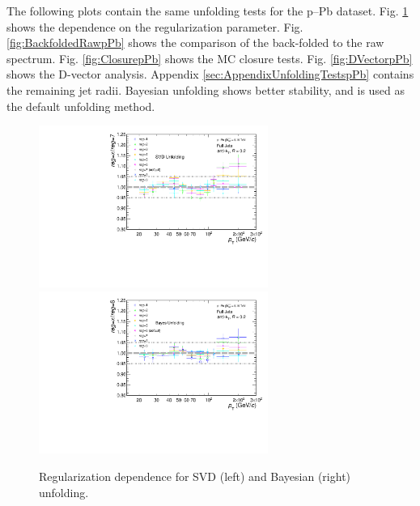 \documentclass[ALICE]{ALICE_analysis_notes}
\newcommand{\pPb}{{\mbox{p--Pb}}\xspace}
\begin{document}
The following plots contain the same unfolding tests for the \pPb dataset. Fig. \ref{fig:RegIterpPb} shows the dependence on the regularization parameter. Fig. \ref{fig:BackfoldedRawpPb} shows the comparison of the back-folded to the raw spectrum. Fig. \ref{fig:ClosurepPb} shows the MC closure tests. Fig. \ref{fig:DVectorpPb} shows the D-vector analysis. Appendix \ref{sec:AppendixUnfoldingTestspPb} contains the remaining jet radii. Bayesian unfolding shows better stability, and is used as the default unfolding method.

\begin{figure}
    \centering
    \begin{multicols}{2}
            \includegraphics[width=7.5cm]{figures/pPbFigures/UnfoldingComparisons/Regularizations/RatioRegularizationSvd_R02.pdf}
        \vfill\null 
        \columnbreak
            \includegraphics[width=7.5cm]{figures/pPbFigures/UnfoldingComparisons/Regularizations/RatioRegularizationBayes_R02.pdf}
        \vfill\null
    \end{multicols}
    \caption{Regularization dependence for SVD (left) and Bayesian (right) unfolding.}
    \label{fig:RegIterpPb}
\end{figure}
\end{document}
